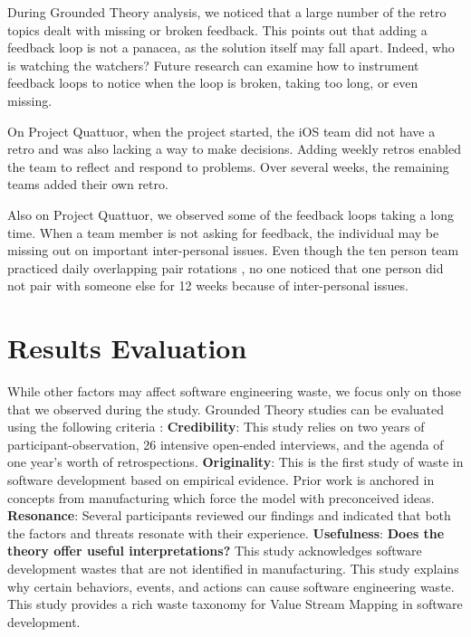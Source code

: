 During Grounded Theory analysis, we noticed that a large number of the retro topics dealt with missing or broken feedback. This points out that adding a feedback loop is not a panacea, as the solution itself may fall apart. Indeed, who is watching the watchers? Future research can examine how to instrument feedback loops to notice when the loop is broken, taking too long, or even missing.

On Project Quattuor, when the project started, the iOS team did not have a retro and was also lacking a way to make decisions. Adding weekly retros enabled the team to reflect and respond to problems. Over several weeks, the remaining teams added their own retro. 

Also on Project Quattuor, we observed some of the feedback loops taking a long time. When a team member is not asking for feedback, the individual may be missing out on important inter-personal issues. Even though the ten person team practiced daily overlapping pair rotations \cite{SedanoSustainableSoftware}, no one noticed that one person did not pair with someone else for 12 weeks because of inter-personal issues. 


\section{Results Evaluation}
\label{ResultsEvaluation}
While other factors may affect software engineering waste, we focus only on those that we observed during the study. Grounded Theory studies can be evaluated using the following criteria \cite{Charmaz, StolGroundedTheory}:
\textbf{Credibility}:   This study relies on two years of participant-observation, 26 intensive open-ended interviews, and the agenda of one year's worth of retrospections. 
\textbf{Originality}:   This is the first study of waste in software development based on empirical evidence. Prior work is anchored in concepts from manufacturing which force the model with preconceived ideas. 
\textbf{Resonance}:  Several participants reviewed our findings and indicated that both the factors and threats resonate with their experience.
\textbf{Usefulness}: \textbf{Does the theory offer useful interpretations?} This study acknowledges software development wastes that are not identified in manufacturing. This study explains why certain behaviors, events, and actions can cause software engineering waste. This study provides a rich waste taxonomy for Value Stream Mapping in software development. 

